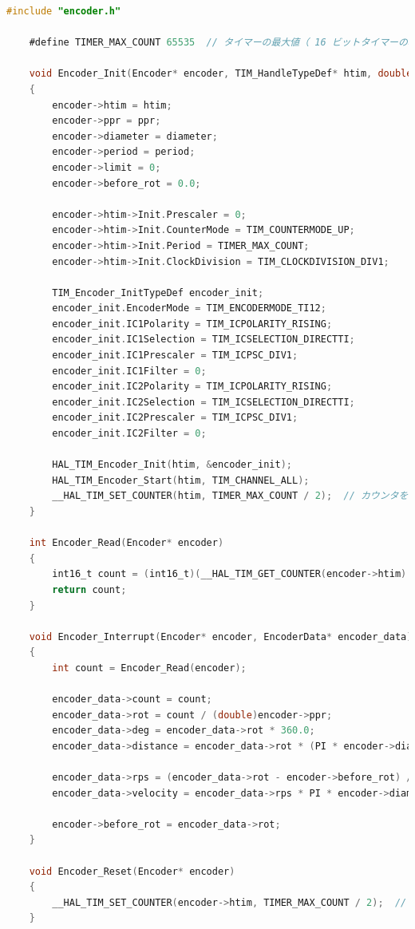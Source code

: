 \begin{lstlisting}[language=C, caption=エンコーダーライブラリ(encoder.c)]
    #include "encoder.h"

    #define TIMER_MAX_COUNT 65535  // タイマーの最大値（ 16 ビットタイマーの場合）
    
    void Encoder_Init(Encoder* encoder, TIM_HandleTypeDef* htim, double diameter, int ppr, int period)
    {
        encoder->htim = htim;
        encoder->ppr = ppr;
        encoder->diameter = diameter;
        encoder->period = period;
        encoder->limit = 0;
        encoder->before_rot = 0.0;
    
        encoder->htim->Init.Prescaler = 0;
        encoder->htim->Init.CounterMode = TIM_COUNTERMODE_UP;
        encoder->htim->Init.Period = TIMER_MAX_COUNT;
        encoder->htim->Init.ClockDivision = TIM_CLOCKDIVISION_DIV1;
    
        TIM_Encoder_InitTypeDef encoder_init;
        encoder_init.EncoderMode = TIM_ENCODERMODE_TI12;
        encoder_init.IC1Polarity = TIM_ICPOLARITY_RISING;
        encoder_init.IC1Selection = TIM_ICSELECTION_DIRECTTI;
        encoder_init.IC1Prescaler = TIM_ICPSC_DIV1;
        encoder_init.IC1Filter = 0;
        encoder_init.IC2Polarity = TIM_ICPOLARITY_RISING;
        encoder_init.IC2Selection = TIM_ICSELECTION_DIRECTTI;
        encoder_init.IC2Prescaler = TIM_ICPSC_DIV1;
        encoder_init.IC2Filter = 0;
    
        HAL_TIM_Encoder_Init(htim, &encoder_init);
        HAL_TIM_Encoder_Start(htim, TIM_CHANNEL_ALL);
        __HAL_TIM_SET_COUNTER(htim, TIMER_MAX_COUNT / 2);  // カウンタを中央に設定
    }
    
    int Encoder_Read(Encoder* encoder)
    {
        int16_t count = (int16_t)(__HAL_TIM_GET_COUNTER(encoder->htim) - TIMER_MAX_COUNT / 2);
        return count;
    }
    
    void Encoder_Interrupt(Encoder* encoder, EncoderData* encoder_data)
    {
        int count = Encoder_Read(encoder);
    
        encoder_data->count = count;
        encoder_data->rot = count / (double)encoder->ppr;
        encoder_data->deg = encoder_data->rot * 360.0;
        encoder_data->distance = encoder_data->rot * (PI * encoder->diameter);
    
        encoder_data->rps = (encoder_data->rot - encoder->before_rot) / (encoder->period * 0.001);
        encoder_data->velocity = encoder_data->rps * PI * encoder->diameter;
    
        encoder->before_rot = encoder_data->rot;
    }
    
    void Encoder_Reset(Encoder* encoder)
    {
        __HAL_TIM_SET_COUNTER(encoder->htim, TIMER_MAX_COUNT / 2);  // カウンタを中央にリセット
    }
\end{lstlisting}

